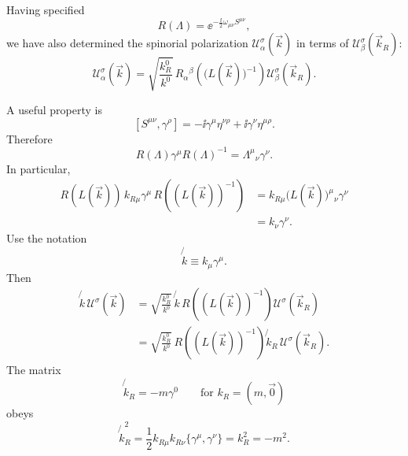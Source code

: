Having specified
\[
  R(\Lambda)=\ee^{-\frac{\ii}{2}\omega_{\mu\nu}S^{\mu\nu}},
\]
we have also determined the spinorial polarization
\(\mathcal U_\alpha^\sigma(\vec k)\) in terms of
\(\mathcal U_\beta^\sigma(\vec k_R)\):
\[
  \mathcal U_\alpha^\sigma(\vec k)
  =
  \sqrt{\frac{k_R^0}{k^0}}\,
  R_\alpha{}^\beta\!\left(\bigl(L(\vec k)\bigr)^{-1}\right)
  \mathcal U_\beta^\sigma(\vec k_R).
\]

A useful property is
\[
  [S^{\mu\nu},\gamma^\rho]
  =
  -\ii\gamma^\mu\eta^{\nu\rho}
  +\ii\gamma^\nu\eta^{\mu\rho}.
\]
Therefore
\[
  R(\Lambda)\gamma^\mu R(\Lambda)^{-1}
  =
  \Lambda^\mu{}_\nu\gamma^\nu.
\]
In particular,
\[
\begin{aligned}
R(L(\vec k))\,k_{R\mu}\gamma^\mu\,R\!\left((L(\vec k))^{-1}\right)
&=
k_{R\mu}\bigl(L(\vec k)\bigr)^\mu{}_\nu\gamma^\nu
\\
&=
k_\nu\gamma^\nu.
\end{aligned}
\]
Use the notation
\[
  \not{k}\equiv k_\mu\gamma^\mu.
\]
Then
\[
\begin{aligned}
\not{k}\,\mathcal U^\sigma(\vec k)
&=
\sqrt{\frac{k_R^0}{k^0}}\,
\not{k}\,R\!\left((L(\vec k))^{-1}\right)
\mathcal U^\sigma(\vec k_R)
\\
&=
\sqrt{\frac{k_R^0}{k^0}}\,
R\!\left((L(\vec k))^{-1}\right)
\not{k}_R\,\mathcal U^\sigma(\vec k_R).
\end{aligned}
\]
The matrix
\[
  \not{k}_R=-m\gamma^0
  \qquad\text{for }k_R=(m,\vec0)
\]
obeys
\[
  \not{k}_R^2
  =
  \frac12 k_{R\mu}k_{R\nu}\{\gamma^\mu,\gamma^\nu\}
  =
  k_R^2
  =
  -m^2.
\]

